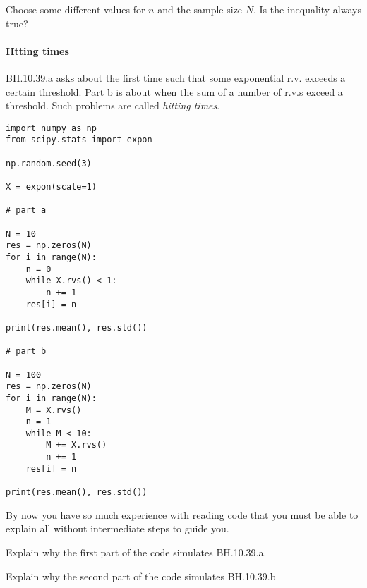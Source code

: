 \documentclass[assignments]{subfiles}
\begin{document}
\begin{exercise}
Choose some different values for $n$ and the sample size $N$. Is the inequality always true?
\begin{solution}
\end{solution}
\end{exercise}

\paragraph{Htting times} BH.10.39.a asks about the first time such that some exponential r.v.
exceeds a certain threshold.
Part b is about when the sum of a number of r.v.s exceed a threshold.
Such problems are called \emph{hitting times}.

\begin{verbatim}
import numpy as np
from scipy.stats import expon

np.random.seed(3)

X = expon(scale=1)

# part a

N = 10
res = np.zeros(N)
for i in range(N):
    n = 0
    while X.rvs() < 1:
        n += 1
    res[i] = n

print(res.mean(), res.std())

# part b

N = 100
res = np.zeros(N)
for i in range(N):
    M = X.rvs()
    n = 1
    while M < 10:
        M += X.rvs()
        n += 1
    res[i] = n

print(res.mean(), res.std())
\end{verbatim}

By now you have so much experience with reading code that you must be able to explain all without intermediate steps to guide you.
\begin{exercise}
Explain why the first part of the code simulates BH.10.39.a.
\begin{solution}
\end{solution}
\end{exercise}

\begin{exercise}
Explain why the second part of the code simulates BH.10.39.b
\begin{solution}
\end{solution}
\end{exercise}
\end{document}
